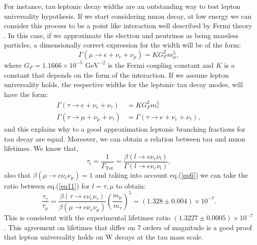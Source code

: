 For instance, tau leptonic decay widths are an outstanding way to test lepton universality hypothesis. If we start considering muon decay, at low energy we can consider this process to be a point like interaction well described by Fermi theory \cite{FermiTheory}. In this case, if we approximate the electron and neutrinos as being massless particles, a dimensionally correct expression for the width will be of the form:
\begin{equation}
	\Gamma(\mu\to e+\nu_e +\nu_\mu)=KG_{F}^{2}m_{\mu}^{5},
\end{equation} 
where $G_F=1.1666\times 10^{-5} \text{ GeV}^{-2}$ is the Fermi coupling constant and $K$ is a constant that depends on the form of the interaction. If we assume lepton universality holds, the respective widths for the leptonic tau decay modes, will have the form:
\begin{align}
\Gamma(\tau\to e+\nu_e +\nu_\tau)&=KG_{F}^{2}m_{\tau}^{5}
\\
\Gamma(\tau\to \mu+\nu_\mu +\nu_\tau)&=\Gamma(\tau\to e+\nu_e +\nu_\tau),
\end{align}  
and this explains why to a good approximation leptonic branching fractions for tau decay are equal. Moreover, we can obtain a relation between tau and muon lifetimes. We know that,
\begin{equation}
	\tau_l=\frac{1}{\Gamma_\text{Tot}}=\frac{\beta(l\to e\nu_e \nu_l)}{\Gamma(l\to e\nu_e \nu_l)},
	\label{eq11}
\end{equation}
also that $\beta(\mu\to e\nu_e \nu_\mu)=1$ and taking into account eq.(\ref{eq6}) we can take the ratio between eq.(\ref{eq11}) for $l=\tau ,\mu$ to obtain:
\begin{equation}
\frac{\tau_\tau}{\tau_\mu}=\frac{\beta(\tau\to e\nu_e \nu_\tau)}{\beta(\mu\to e\nu_e \nu_\mu)}\left(\frac{m_\mu}{m_\tau}\right)^5=(1.328\pm 0.004)\times 10^{-7}.
\end{equation}
This is consistent with the experimental lifetimes ratio $(1.3227\pm 0.0005)\times10^{-7}$. This agreement on lifetimes that differ on 7 orders of magnitude is a good proof that lepton universality holds on W decays at the tau mass scale.

